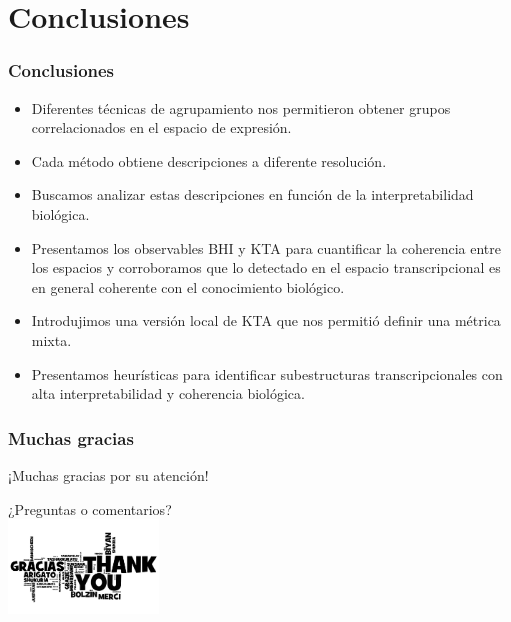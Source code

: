 \documentclass[serif,9pt, t]{beamer}
\begin{document}
\section{Conclusiones}
\begin{frame}\frametitle{Conclusiones}
\bigskip
\begin{itemize}
\item Diferentes técnicas de agrupamiento nos permitieron obtener grupos correlacionados en el espacio de expresión.
\item Cada método obtiene descripciones a diferente resolución.
\item Buscamos analizar estas descripciones en función de la interpretabilidad biológica.
\item Presentamos los observables BHI y KTA para cuantificar la coherencia entre los espacios y corroboramos que lo detectado en el espacio transcripcional es en general coherente con el conocimiento biológico.
\item Introdujimos una versión local de KTA que nos permitió definir una métrica mixta.
\item Presentamos heurísticas para identificar subestructuras transcripcionales con alta interpretabilidad y coherencia biológica.
\end{itemize}
\end{frame}

\begin{frame}\frametitle{Muchas gracias}
\huge
\centering
¡Muchas gracias por su atención!

\vspace{50pt}
¿Preguntas o comentarios?\\
\vspace{70pt}
\hfill
\includegraphics[width=0.3\textwidth]{gracias.jpg}

\end{frame}
\end{document}

